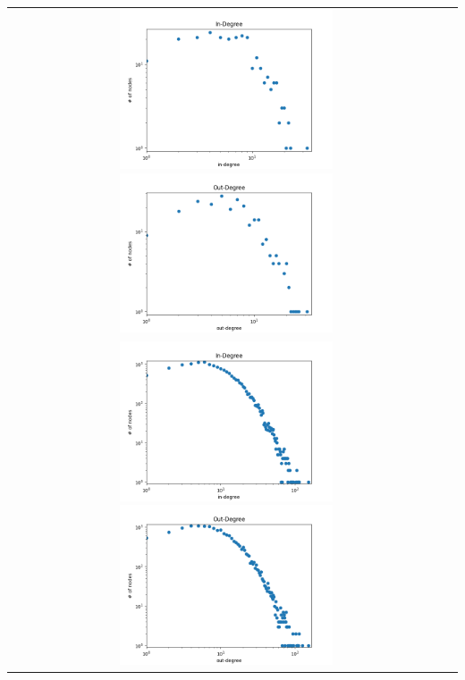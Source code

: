 \documentclass[12pt, letterpaper, twoside]{article}
\begin{document}
\begin{center}
\begin{longtable}{ c c }
    \includegraphics[width=0.5\textwidth]{2S_indeg.png} \includegraphics[width=0.5\textwidth]{2S_outdeg.png} \\
    \includegraphics[width=0.5\textwidth]{2L_indeg.png} \includegraphics[width=0.5\textwidth]{2L_outdeg.png} \\

\end{longtable}
\end{center}
\end{document}
